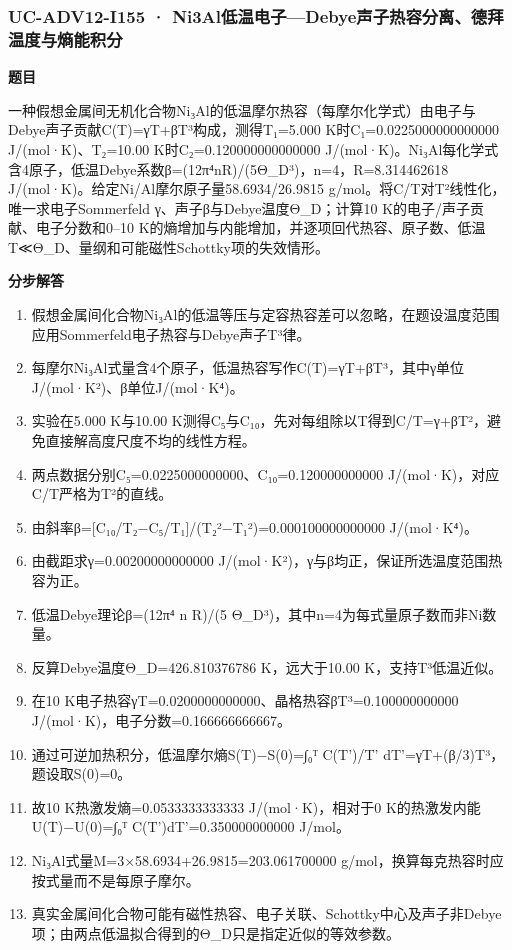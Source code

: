 \documentclass[UTF8,11pt,a4paper]{ctexart}
\begin{document}
\subsubsection*{UC-ADV12-I155 · Ni3Al低温电子—Debye声子热容分离、德拜温度与熵能积分}
\noindent\textbf{题目}\par
一种假想金属间无机化合物Ni₃Al的低温摩尔热容（每摩尔化学式）由电子与Debye声子贡献C(T)=γT+βT³构成，测得T₁=5.000 K时C₁=0.0225000000000000 J/(mol·K)、T₂=10.00 K时C₂=0.120000000000000 J/(mol·K)。Ni₃Al每化学式含4原子，低温Debye系数β=(12π⁴nR)/(5Θ\_D³)，n=4，R=8.314462618 J/(mol·K)。给定Ni/Al摩尔原子量58.6934/26.9815 g/mol。将C/T对T²线性化，唯一求电子Sommerfeld γ、声子β与Debye温度Θ\_D；计算10 K的电子/声子贡献、电子分数和0–10 K的熵增加与内能增加，并逐项回代热容、原子数、低温T≪Θ\_D、量纲和可能磁性Schottky项的失效情形。\par
\medskip\noindent\textbf{分步解答}
\begin{enumerate}
\item 假想金属间化合物Ni₃Al的低温等压与定容热容差可以忽略，在题设温度范围应用Sommerfeld电子热容与Debye声子T³律。
\item 每摩尔Ni₃Al式量含4个原子，低温热容写作C(T)=γT+βT³，其中γ单位J/(mol·K²)、β单位J/(mol·K⁴)。
\item 实验在5.000 K与10.00 K测得C₅与C₁₀，先对每组除以T得到C/T=γ+βT²，避免直接解高度尺度不均的线性方程。
\item 两点数据分别C₅=0.0225000000000、C₁₀=0.120000000000 J/(mol·K)，对应C/T严格为T²的直线。
\item 由斜率β=[C₁₀/T₂−C₅/T₁]/(T₂²−T₁²)=0.000100000000000 J/(mol·K⁴)。
\item 由截距求γ=0.00200000000000 J/(mol·K²)，γ与β均正，保证所选温度范围热容为正。
\item 低温Debye理论β=(12π⁴ n R)/(5 Θ\_D³)，其中n=4为每式量原子数而非Ni数量。
\item 反算Debye温度Θ\_D=426.810376786 K，远大于10.00 K，支持T³低温近似。
\item 在10 K电子热容γT=0.0200000000000、晶格热容βT³=0.100000000000 J/(mol·K)，电子分数=0.166666666667。
\item 通过可逆加热积分，低温摩尔熵S(T)−S(0)=∫₀ᵀ C(T')/T' dT'=γT+(β/3)T³，题设取S(0)=0。
\item 故10 K热激发熵=0.0533333333333 J/(mol·K)，相对于0 K的热激发内能U(T)−U(0)=∫₀ᵀ C(T')dT'=0.350000000000 J/mol。
\item Ni₃Al式量M=3×58.6934+26.9815=203.061700000 g/mol，换算每克热容时应按式量而不是每原子摩尔。
\item 真实金属间化合物可能有磁性热容、电子关联、Schottky中心及声子非Debye项；由两点低温拟合得到的Θ\_D只是指定近似的等效参数。
\end{enumerate}
\end{document}
